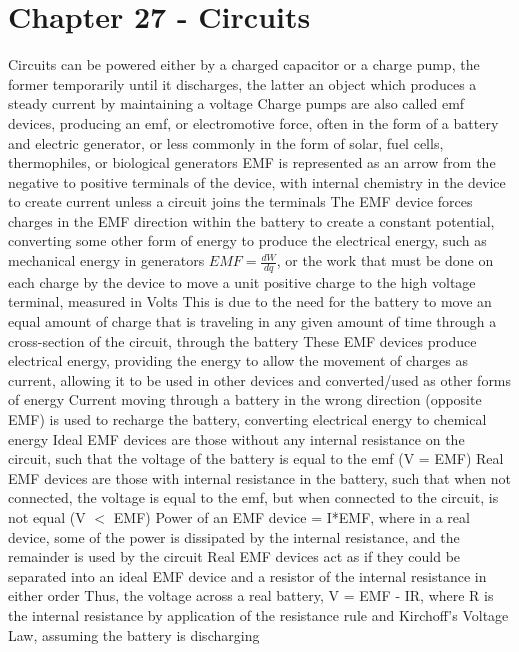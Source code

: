 \documentclass[11 pt, twoside]{article}
\newenvironment{outline*}
{
	\begin{outline}[enumerate]
	}
	{\end{outline}
}
\begin{document}
\section{Chapter 27 - Circuits}
\begin{outline*}
\1 Circuits can be powered either by a charged capacitor or a charge pump, the former temporarily until it discharges, the latter an object which produces a steady current by maintaining a voltage
\2 Charge pumps are also called emf devices, producing an emf, or electromotive force, often in the form of a battery and electric generator, or less commonly in the form of solar, fuel cells, thermophiles, or biological generators
\2 EMF is represented as an arrow from the negative to positive terminals of the device, with internal chemistry in the device to create current unless a circuit joins the terminals
\2 The EMF device forces charges in the EMF direction within the battery to create a constant potential, converting some other form of energy to produce the electrical energy, such as mechanical energy in generators
\2 $EMF = \frac{dW}{dq}$, or the work that must be done on each charge by the device to move a unit positive charge to the high voltage terminal, measured in Volts
\3 This is due to the need for the battery to move an equal amount of charge that is traveling in any given amount of time through a cross-section of the circuit, through the battery
\2 These EMF devices produce electrical energy, providing the energy to allow the movement of charges as current, allowing it to be used in other devices and converted/used as other forms of energy
\2 Current moving through a battery in the wrong direction (opposite EMF) is used to recharge the battery, converting electrical energy to chemical energy
\1 Ideal EMF devices are those without any internal resistance on the circuit, such that the voltage of the battery is equal to the emf (V = EMF)
\2 Real EMF devices are those with internal resistance in the battery, such that when not connected, the voltage is equal to the emf, but when connected to the circuit, is not equal (V $<$ EMF)
\2 Power of an EMF device = I*EMF, where in a real device, some of the power is dissipated by the internal resistance, and the remainder is used by the circuit
\3 Real EMF devices act as if they could be separated into an ideal EMF device and a resistor of the internal resistance in either order
\3 Thus, the voltage across a real battery, V = EMF - IR, where R is the internal resistance by application of the resistance rule and Kirchoff's Voltage Law, assuming the battery is discharging

\end{outline*}
\end{document}
